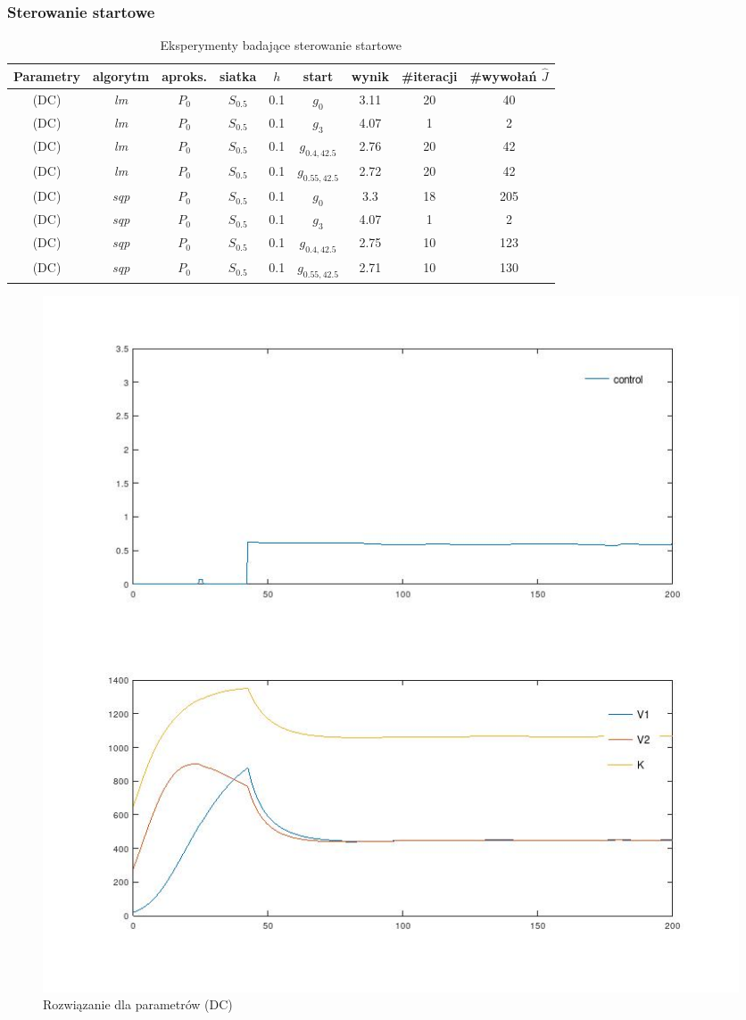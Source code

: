 \documentclass[11pt]{article}
\begin{document}
\subsubsection{Sterowanie startowe}

\begin{table}[h]
  \begin{center}
    \begin{tabular}{|c|c|c|c|c|c|c|c|c|}
      \hline
      Parametry & algorytm & aproks. & siatka & $h$ & start & wynik & \#iteracji & \#wywołań $\hat{J}$ \\
      \hline
      (DC) & {\it lm\/} & $P_0$ & $S_{0.5}$ & 0.1 & $g_0$ & 3.11 & 20 & 40 \\
      \hline
      (DC) & {\it lm\/} & $P_0$ & $S_{0.5}$ & 0.1 & $g_3$ & 4.07 & 1 & 2 \\
      \hline
      (DC) & {\it lm\/} & $P_0$ & $S_{0.5}$ & 0.1 & $g_{0.4,42.5}$ & 2.76 & 20 & 42 \\
      \hline
      (DC) & {\it lm\/} & $P_0$ & $S_{0.5}$ & 0.1 & $g_{0.55,42.5}$ & 2.72 & 20 & 42 \\
      \hline
      (DC) & {\it sqp\/} & $P_0$ & $S_{0.5}$ & 0.1 & $g_0$ & 3.3 & 18 & 205 \\
      \hline
      (DC) & {\it sqp\/} & $P_0$ & $S_{0.5}$ & 0.1 & $g_3$ & 4.07 & 1 & 2 \\
      \hline
      (DC) & {\it sqp\/} & $P_0$ & $S_{0.5}$ & 0.1 & $g_{0.4,42.5}$ & 2.75 & 10 & 123 \\
      \hline
      (DC) & {\it sqp\/} & $P_0$ & $S_{0.5}$ & 0.1 & $g_{0.55,42.5}$ & 2.71 & 10 & 130 \\
      \hline
    \end{tabular}
    \caption{Eksperymenty badające sterowanie startowe}\label{start_tbl}
  \end{center}
\end{table}

\begin{figure}[h]
  \centering
  \includegraphics[width=.5\textwidth]{../plots/plot_param2_best}
  \caption{Rozwiązanie dla parametrów (DC)}\label{param2_best_sol}
\end{figure}
\end{document}
